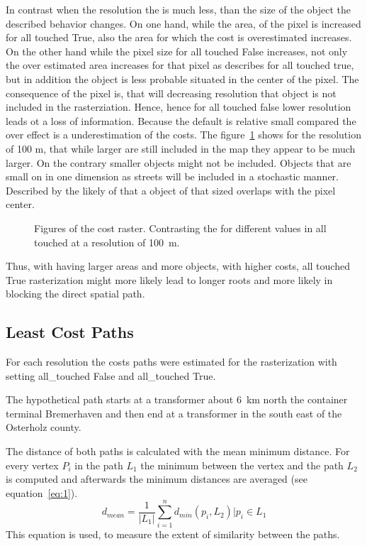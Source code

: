In contrast when the resolution the is much less, than the size of the object the described behavior changes.
On one hand, while the area, of the pixel is increased for all touched True, also the area for which the cost is overestimated increases.
On the other hand while the pixel size for all touched  False increases, not only the over estimated area increases for that pixel as describes for all touched true, but in addition the object is less probable situated in the center of the pixel.
The consequence of the pixel is, that will decreasing resolution that object is not included in the rasterziation.
Hence, hence for all touched false lower resolution  leads ot a loss of information.
Because the default is relative small compared the over effect is a underestimation of the costs.
The figure~\ref{fig:costs_100m} shows for the resolution of 100 m, that while larger are still included in the map they appear to be much larger.
On the contrary smaller objects might not be included.
Objects that are small on in one dimension as streets will be included in a stochastic manner.
Described by the likely of that a object of that sized overlaps with the pixel center.
\begin{figure}
	\centering

	\qquad
	\caption{Figures of the cost raster. Contrasting the for different values in all touched at a resolution of 100~m.}
	\label{fig:costs_100m}
\end{figure}
Thus, with having larger areas and more objects, with higher costs, all touched True rasterization might more likely lead to longer roots and more likely in blocking the  direct spatial path.

\subsection{Least Cost Paths}\label{subsec:least-cost-paths}
For each resolution the costs paths were estimated for the rasterization with setting all\_touched False
and all\_touched True.

The hypothetical path starts at a transformer about 6~km north the container terminal Bremerhaven and then end at a transformer in the south east of the Osterholz county. 

The distance of both paths is calculated with the mean minimum distance.
For every vertex $P_i$ in the path $L_1$ the minimum between the vertex and the path $L_2$
is computed and afterwards the minimum distances are averaged (see equation~\ref{eq:1}).
\begin{equation}
	\label{eq:1}
	d_{mean} = \frac{1}{|L_1|} \sum_{i=1}^{n} d_{min}(p_i, L_2) \bigg\vert p_i \in L_1
\end{equation}
This equation is used, to measure the extent of similarity between the paths.

